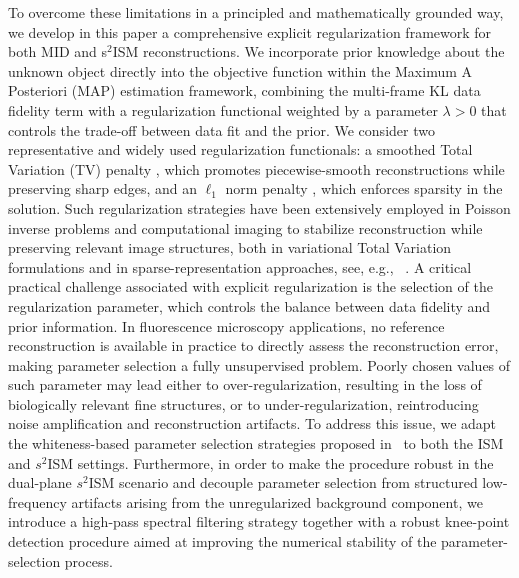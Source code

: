 \documentclass[letterpaper]{article}
\begin{document}
To overcome these limitations in a principled and mathematically grounded way, we develop in this paper a comprehensive explicit regularization framework for both MID and s$^2$ISM reconstructions. We incorporate prior knowledge about the unknown object directly into the objective function within the Maximum A Posteriori (MAP) estimation framework, combining the multi-frame KL data fidelity term with a regularization functional weighted by a parameter $\lambda>0$ that controls the trade-off between data fit and the prior. We consider two representative and widely used regularization functionals: a smoothed Total Variation (TV) penalty \cite{RUDIN1992259}, which promotes piecewise-smooth reconstructions while preserving sharp edges, and an $\ell_1$ norm penalty \cite{Candes}, which enforces sparsity in the solution. 
Such regularization strategies have been extensively employed in Poisson inverse problems and computational imaging to stabilize reconstruction while preserving relevant image structures, both in variational Total Variation formulations and in sparse-representation approaches, see, e.g., ~\cite{Dupe2009,Figureido2010,carl_blanc_f}. A critical practical challenge associated with explicit regularization is the selection of the regularization parameter, which controls the balance between data fidelity and prior information. In fluorescence microscopy applications, no reference reconstruction is available in practice to directly assess the reconstruction error, making parameter selection a fully unsupervised problem. Poorly chosen values of such parameter may lead either to over-regularization, resulting in the loss of biologically relevant fine structures, or to under-regularization, reintroducing noise amplification and reconstruction artifacts.
To address this issue, we adapt the whiteness-based parameter selection strategies proposed in~\cite{BEVILACQUA2023197,Bevilacqua_2023,bevilacqua2021nearly} to both the ISM and $s^2$ISM settings. Furthermore, in order to make the procedure robust in the dual-plane $s^2$ISM scenario and decouple parameter selection from structured low-frequency artifacts arising from the unregularized background component, we introduce a high-pass spectral filtering strategy together with a robust knee-point detection procedure aimed at improving the numerical stability of the parameter-selection process.
\end{document}

